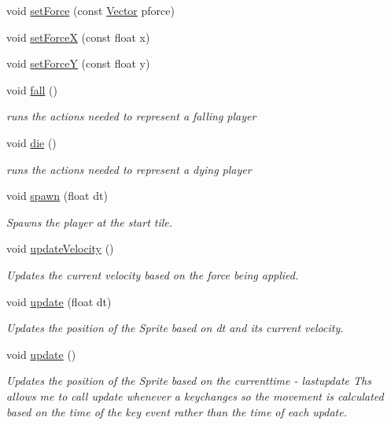 \begin{DoxyCompactItemize}
void \hyperlink{class_b_player_ae97ab8470903f7c595939f2331b6c6f4}{set\-Force} (const \hyperlink{struct_vector}{\-Vector} pforce)
\item 
void \hyperlink{class_b_player_af7ae69e5c1d7880a5ebf4bd38c1adabb}{set\-Force\-X} (const float x)
\item 
void \hyperlink{class_b_player_a94916a0f75042c2e6265fa7c9ec4db32}{set\-Force\-Y} (const float y)
\item 
void \hyperlink{class_b_player_a7981065d2d5b4c581d84cb5b63a15d00}{fall} ()
\begin{DoxyCompactList}\small\item\em runs the actions needed to represent a falling player \end{DoxyCompactList}\item 
void \hyperlink{class_b_player_a5a46736f890786b465bfe51c9c4f8ff7}{die} ()
\begin{DoxyCompactList}\small\item\em runs the actions needed to represent a dying player \end{DoxyCompactList}\item 
void \hyperlink{class_b_player_a1f66cceac56c4252237f6e30003efa4d}{spawn} (float dt)
\begin{DoxyCompactList}\small\item\em \-Spawns the player at the start tile. \end{DoxyCompactList}\item 
void \hyperlink{class_b_player_aa0f9b22686ad0aeec30ea21beb3740f2}{update\-Velocity} ()
\begin{DoxyCompactList}\small\item\em \-Updates the current velocity based on the force being applied. \end{DoxyCompactList}\item 
void \hyperlink{class_b_player_a86f9b0c0d7b4c61ed475f0e70249be7f}{update} (float dt)
\begin{DoxyCompactList}\small\item\em \-Updates the position of the \-Sprite based on dt and its current velocity. \end{DoxyCompactList}\item 
void \hyperlink{class_b_player_a709a36eb859dd8f9a4355e036eac8ac8}{update} ()
\begin{DoxyCompactList}\small\item\em \-Updates the position of the \-Sprite based on the currenttime -\/ lastupdate \-Ths allows me to call update whenever a keychanges so the movement is calculated based on the time of the key event rather than the time of each update. \end{DoxyCompactList}\item 

\end{DoxyCompactItemize}
